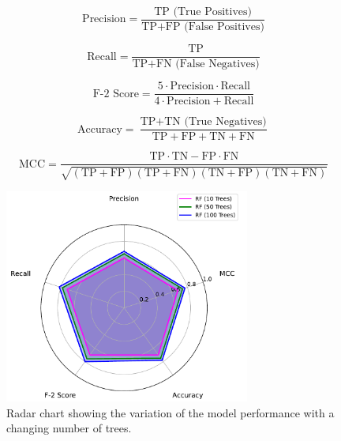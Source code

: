 \begin{equation}
\label{eq:precision}
\text{Precision} = \frac{\text{TP (True Positives)}}{\text{TP} + \text{FP (False Positives)}}
\end{equation}

\begin{equation}
\text{Recall} = \frac{\text{TP}}{\text{TP} + \text{FN (False Negatives)}}
\end{equation}

\begin{equation}
\text{F-}2\text{ Score} = \frac{5 \cdot \text{Precision} \cdot \text{Recall}}{4 \cdot \text{Precision} + \text{Recall}}
\end{equation}

\begin{equation}
\text{Accuracy} = \frac{\text{TP} + \text{TN (True Negatives)}}{\text{TP} + \text{FP} + \text{TN} + \text{FN}}
\end{equation}

\begin{equation}
\label{eq:mcc}
\text{MCC} = \frac{ \text{TP} \cdot \text{TN} - \text{FP} \cdot \text{FN} }{ \sqrt{ (\text{TP} + \text{FP}) (\text{TP} + \text{FN}) (\text{TN} + \text{FP}) (\text{TN} + \text{FN}) } }
\end{equation}




\begin{figure}[H]
\centering
\includegraphics[width=0.72\textwidth]{figs/Samuel/Figures/rf_comparison (3) (1).pdf}
\caption{Radar chart showing the variation of the model performance with a changing number of trees.}
\label{fig:radchart}
\end{figure}






